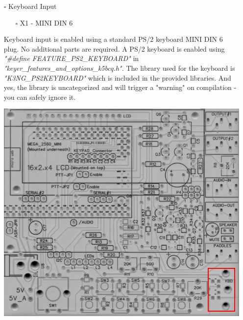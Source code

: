 \documentclass[11pt]{article}
\begin{document}
\newpage
\begin{itemize}
\item[{$\square$}] Keyboard Input
\begin{itemize}
\item[{$\square$}] X1 - MINI DIN 6
\end{itemize}

 Keyboard input is enabled using a standard PS/2 keyboard MINI DIN 6 plug.  No additional parts are required.  A PS/2 keyboard is enabled using \emph{"\#define FEATURE\_PS2\_KEYBOARD"} in \emph{"keyer\_features\_and\_options\_k5bcq.h".}  The library used for the keyboard is \emph{"K3NG\_PS2KEYBOARD"} which is included in the provided libraries.  And yes, the library is uncategorized and will trigger a "warning" on compilation - you can safely ignore it.
\begin{center}
\includegraphics[width=.9\linewidth]{../png/3.2/pcb-top-mini-din-6.png}
\end{center}
\end{itemize}
\end{document}
